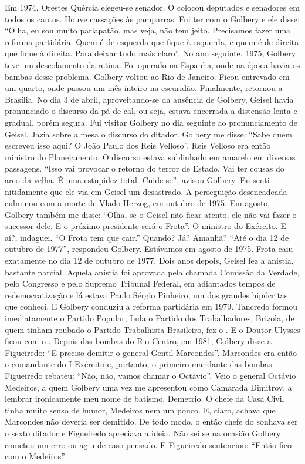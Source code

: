 \normalfont
Em 1974, Orestes Quércia elegeu-se senador. O  colocou
deputados e senadores em todos os cantos. Houve cassações às pamparras.
Fui ter com o Golbery e ele disse: ``Olha, eu sou muito parlapatão, mas
veja, não tem jeito. Precisamos fazer uma reforma partidária. Quem é de
esquerda que fique à esquerda, e quem é de direita que fique à direita.
Para deixar tudo mais claro''. No ano seguinte, 1975, Golbery teve um
descolamento da retina. Foi operado na Espanha, onde na época havia os
bambas desse problema. Golbery voltou ao Rio de Janeiro. Ficou entrevado
em um quarto, onde passou um mês inteiro na escuridão. Finalmente,
retornou a Brasília. No dia 3 de abril, aproveitando-se da ausência de
Golbery, Geisel havia pronunciado o discurso da pá de cal, ou seja,
estava encerrada a distensão lenta e gradual, porém segura. Fui visitar
Golbery no dia seguinte ao pronunciamento de Geisel. Jazia sobre a mesa
o discurso do ditador. Golbery me disse: ``Sabe quem escreveu isso aqui?
O João Paulo dos Reis Velloso''. Reis Velloso era então ministro do
Planejamento. O discurso estava sublinhado em amarelo em diversas
passagens. ``Isso vai provocar o retorno do terror de Estado. Vai ter
cousas do arco-da-velha. É uma estupidez total. Cuide-se'', avisou
Golbery. Eu senti nitidamente que ele via em Geisel um desastrado. A
perseguição desencadeada culminou com a morte de Vlado Herzog, em
outubro de 1975. Em agosto, Golbery também me disse: ``Olha, se o Geisel
não ficar atento, ele não vai fazer o sucessor dele. E o próximo
presidente será o Frota''. O ministro do Exército. E aí?, indaguei. ``O
Frota tem que cair.'' Quando? Já? Amanhã? ``Até o dia 12 de outubro de
1977'', respondeu Golbery. Estávamos em agosto de 1975. Frota caiu
exatamente no dia 12 de outubro de 1977. Dois anos depois, Geisel fez a
anistia, bastante parcial. Aquela anistia foi aprovada pela chamada
Comissão da Verdade, pelo Congresso e pelo Supremo Tribunal Federal, em
adiantados tempos de redemocratização e lá estava Paulo Sérgio Pinheiro,
um dos grandes hipócritas que conheci. E Golbery conduziu a reforma
partidária em 1979. Tancredo formou imediatamente o Partido Popular,
Lula o Partido dos Trabalhadores, Brizola, de quem tinham roubado o
Partido Trabalhista Brasileiro, fez o . E o Doutor Ulysses ficou com
o . Depois das bombas do Rio Centro, em 1981, Golbery disse a
Figueiredo: ``E preciso demitir o general Gentil Marcondes''. Marcondes
era então o comandante do I Exército e, portanto, o primeiro mandante
das bombas. Figueiredo rebateu: ``Não, não, vamos chamar o Octávio''.
Veio o general Octávio Medeiros, a quem Golbery uma vez me apresentou
como Camarada Dimitrov, a lembrar ironicamente meu nome de batismo,
Demetrio. O chefe da Casa Civil tinha muito senso de humor, Medeiros nem
um pouco. E, claro, achava que Marcondes não deveria ser demitido. De
todo modo, o então chefe do  sonhava ser o sexto ditador e Figueiredo
apreciava a ideia. Não sei se na ocasião Golbery cometeu um erro ou agiu
de caso pensado. E Figueiredo sentenciou: ``Então fico com o Medeiros''.

